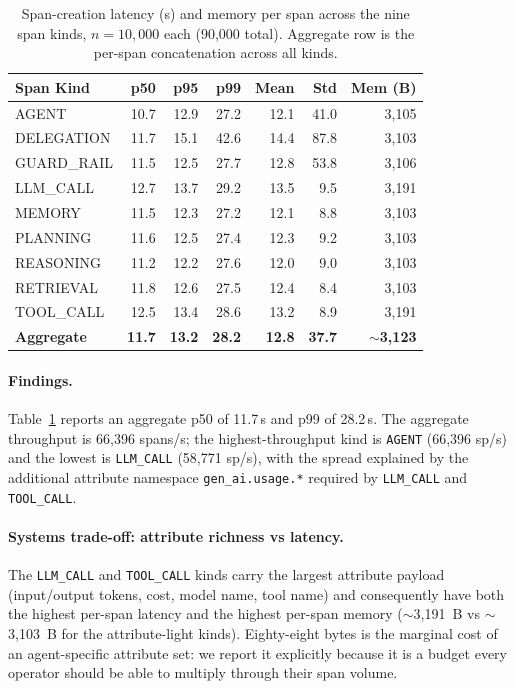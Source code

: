 \documentclass[sigplan,10pt,anonymous,review]{acmart}
\begin{document}
\begin{table}[t]
\centering
\small
\caption{Span-creation latency (\textmu{}s) and memory per span across
the nine span kinds, $n=10{,}000$ each (90{,}000 total). Aggregate row
is the per-span concatenation across all kinds.}
\label{tab:overhead}
\begin{tabular}{@{}lrrrrrr@{}}
\toprule
\textbf{Span Kind} & \textbf{p50} & \textbf{p95} & \textbf{p99}
  & \textbf{Mean} & \textbf{Std} & \textbf{Mem (B)} \\
\midrule
AGENT       & 10.7 & 12.9 & 27.2 & 12.1 & 41.0 & 3{,}105 \\
DELEGATION  & 11.7 & 15.1 & 42.6 & 14.4 & 87.8 & 3{,}103 \\
GUARD\_RAIL & 11.5 & 12.5 & 27.7 & 12.8 & 53.8 & 3{,}106 \\
LLM\_CALL   & 12.7 & 13.7 & 29.2 & 13.5 &  9.5 & 3{,}191 \\
MEMORY      & 11.5 & 12.3 & 27.2 & 12.1 &  8.8 & 3{,}103 \\
PLANNING    & 11.6 & 12.5 & 27.4 & 12.3 &  9.2 & 3{,}103 \\
REASONING   & 11.2 & 12.2 & 27.6 & 12.0 &  9.0 & 3{,}103 \\
RETRIEVAL   & 11.8 & 12.6 & 27.5 & 12.4 &  8.4 & 3{,}103 \\
TOOL\_CALL  & 12.5 & 13.4 & 28.6 & 13.2 &  8.9 & 3{,}191 \\
\midrule
\textbf{Aggregate} & \textbf{11.7} & \textbf{13.2} & \textbf{28.2}
  & \textbf{12.8} & \textbf{37.7} & \textbf{$\sim$3{,}123} \\
\bottomrule
\end{tabular}
\end{table}

\paragraph{Findings.}
Table~\ref{tab:overhead} reports an aggregate p50 of 11.7\,\textmu{}s
and p99 of 28.2\,\textmu{}s. The aggregate throughput is 66{,}396
spans/s; the highest-throughput kind is \texttt{AGENT} (66{,}396 sp/s)
and the lowest is \texttt{LLM\_CALL} (58{,}771 sp/s), with the spread
explained by the additional attribute namespace
\texttt{gen\_ai.usage.*} required by \texttt{LLM\_CALL} and
\texttt{TOOL\_CALL}.

\paragraph{Systems trade-off: attribute richness vs latency.}
The \texttt{LLM\_CALL} and \texttt{TOOL\_CALL} kinds carry the largest
attribute payload (input/output tokens, cost, model name, tool name)
and consequently have both the highest per-span latency and the
highest per-span memory ($\sim$3{,}191~B vs $\sim$3{,}103~B for the
attribute-light kinds). Eighty-eight bytes is the marginal cost of an
agent-specific attribute set: we report it explicitly because it is a
budget every operator should be able to multiply through their span
volume.
\end{document}
